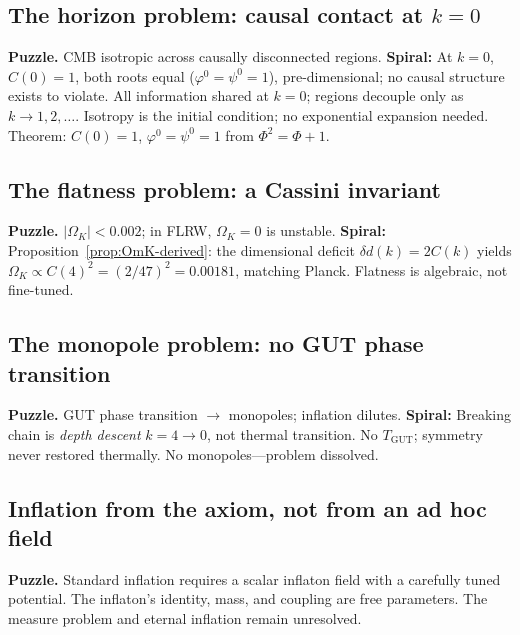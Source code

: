 \documentclass[12pt,a4paper]{article}
\begin{document}
\subsection{The horizon problem: causal contact at $k = 0$}

\noindent\textbf{Puzzle.}\; CMB isotropic across causally disconnected regions. \textbf{Spiral:} At $k = 0$, $C(0) = 1$, both roots equal ($\varphi^0 = \psi^0 = 1$), pre-dimensional; no causal structure exists to violate. All information shared at $k = 0$; regions decouple only as $k \to 1,2,\ldots$. Isotropy is the initial condition; no exponential expansion needed. Theorem: $C(0) = 1$, $\varphi^0 = \psi^0 = 1$ from $\Phi^2 = \Phi + 1$.

\subsection{The flatness problem: a Cassini invariant}

\noindent\textbf{Puzzle.}\; $|\Omega_K| < 0.002$; in FLRW, $\Omega_K = 0$ is unstable. \textbf{Spiral:} Proposition~\ref{prop:OmK-derived}: the dimensional deficit $\delta d(k) = 2C(k)$ yields $\Omega_K \propto C(4)^2 = (2/47)^2 = 0.00181$, matching Planck. Flatness is algebraic, not fine-tuned.

\subsection{The monopole problem: no GUT phase transition}

\noindent\textbf{Puzzle.}\; GUT phase transition $\to$ monopoles; inflation dilutes. \textbf{Spiral:} Breaking chain is \emph{depth descent} $k = 4 \to 0$, not thermal transition. No $T_{\mathrm{GUT}}$; symmetry never restored thermally. No monopoles---problem dissolved.

\subsection{Inflation from the axiom, not from an ad hoc field}
\label{sec:spiral-inflation}

\noindent\textbf{Puzzle.}\; Standard inflation requires a scalar inflaton field with a carefully tuned potential.  The inflaton's identity, mass, and coupling are free parameters.  The measure problem and eternal inflation remain unresolved.
\end{document}
